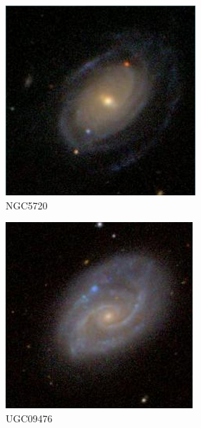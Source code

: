\documentclass[9pt]{revtex4-1}
\begin{document}
\begin{figure}
\includegraphics[scale=0.3]{NGC5720.png}
\caption{NGC5720}
\end{figure}
\begin{figure}
\includegraphics[scale=0.3]{UGC09476.png}
\caption{UGC09476}
\end{figure}

\clearpage
\end{document}
